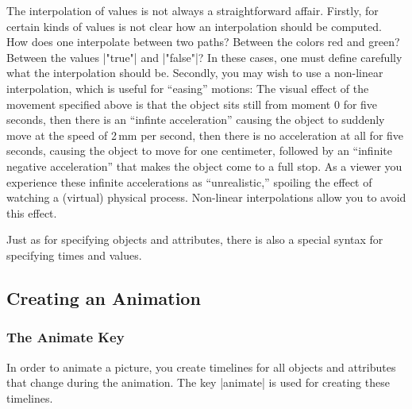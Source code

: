 The interpolation of values is not always a straightforward affair.
Firstly, for certain kinds of values is not clear how an interpolation
should be computed. How does one interpolate between two paths?
Between the colors red and green? Between the values |"true"| and
|"false"|? In these cases, one must define carefully what the
interpolation should be. Secondly, you may wish to use a non-linear
interpolation, which is useful for ``easing'' motions: The visual
effect of the movement 
specified above is that the object sits still from moment $0$ for five
seconds, then there is an ``infinte acceleration'' causing the object
to suddenly move at the speed of 2\,mm per second, then there is no
acceleration at all for five seconds, causing the object to move for
one centimeter, followed by an ``infinite negative acceleration'' that
makes the object come to a full stop. As a viewer you experience these
infinite accelerations as ``unrealistic,'' spoiling the effect of
watching a (virtual) physical process. Non-linear interpolations allow
you to avoid this effect. 

Just as for specifying objects and attributes, there is also a special
syntax for specifying times and values.



\subsection{Creating an Animation}

\subsubsection{The Animate Key}

In order to animate a picture, you create timelines for all objects
and attributes that change during the animation. The key |animate| is
used for creating these timelines.

